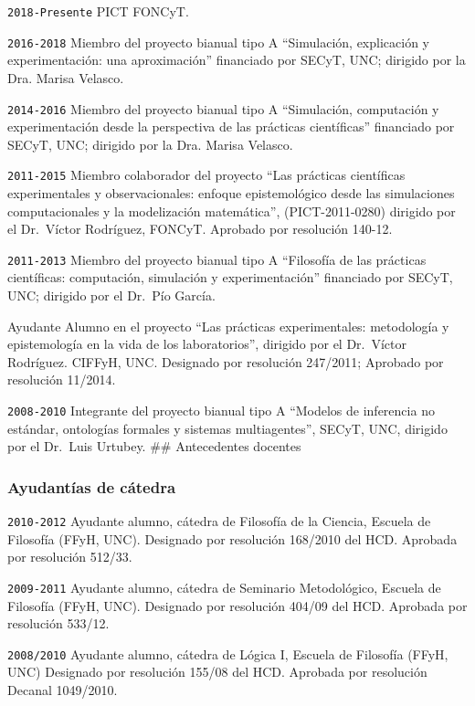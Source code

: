 \documentclass[]{article}
\begin{document}
\texttt{2018-Presente} PICT FONCyT.

\texttt{2016-2018} Miembro del proyecto bianual tipo A ``Simulación,
explicación y experimentación: una aproximación'' financiado por SECyT,
UNC; dirigido por la Dra. Marisa Velasco.

\texttt{2014-2016} Miembro del proyecto bianual tipo A ``Simulación,
computación y experimentación desde la perspectiva de las prácticas
científicas'' financiado por SECyT, UNC; dirigido por la Dra. Marisa
Velasco.

\texttt{2011-2015} Miembro colaborador del proyecto ``Las prácticas
científicas experimentales y observacionales: enfoque epistemológico
desde las simulaciones computacionales y la modelización matemática'',
(PICT-2011-0280) dirigido por el Dr.~Víctor Rodríguez, FONCyT. Aprobado
por resolución 140-12.

\texttt{2011-2013} Miembro del proyecto bianual tipo A ``Filosofía de
las prácticas científicas: computación, simulación y experimentación''
financiado por SECyT, UNC; dirigido por el Dr.~Pío García.

Ayudante Alumno en el proyecto ``Las prácticas experimentales:
metodología y epistemología en la vida de los laboratorios'', dirigido
por el Dr.~Víctor Rodríguez. CIFFyH, UNC. Designado por resolución
247/2011; Aprobado por resolución 11/2014.

\texttt{2008-2010} Integrante del proyecto bianual tipo A ``Modelos de
inferencia no estándar, ontologías formales y sistemas multiagentes'',
SECyT, UNC, dirigido por el Dr.~Luis Urtubey. \#\# Antecedentes docentes

\hypertarget{ayudantuxedas-de-cuxe1tedra}{%
\subsubsection{Ayudantías de
cátedra}\label{ayudantuxedas-de-cuxe1tedra}}

\texttt{2010-2012} Ayudante alumno, cátedra de Filosofía de la Ciencia,
Escuela de Filosofía (FFyH, UNC). Designado por resolución 168/2010 del
HCD. Aprobada por resolución 512/33.

\texttt{2009-2011} Ayudante alumno, cátedra de Seminario Metodológico,
Escuela de Filosofía (FFyH, UNC). Designado por resolución 404/09 del
HCD. Aprobada por resolución 533/12.

\texttt{2008/2010} Ayudante alumno, cátedra de Lógica I, Escuela de
Filosofía (FFyH, UNC) Designado por resolución 155/08 del HCD. Aprobada
por resolución Decanal 1049/2010.
\end{document}
